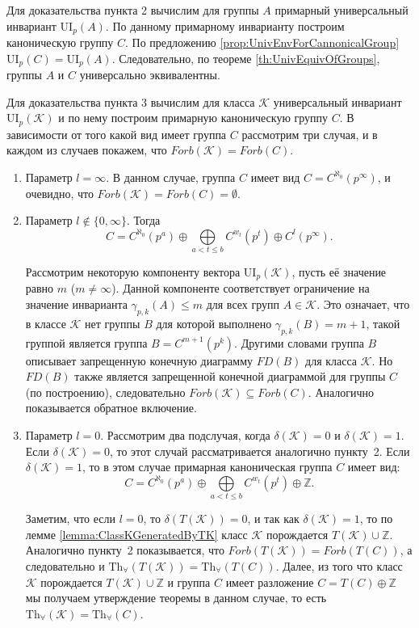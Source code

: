 \documentclass[a4paper,11pt,twoside]{article}
\def\K{{\mathcal{K}}}
\def\Z{{\mathbb{Z}}}
\def\Tha{{\mathrm{Th}_\forall}}
\def\ui{{\mathrm{UI}}}
\begin{document}
Для доказательства пункта 2 вычислим для группы $A$ примарный универсальный инвариант $\ui_p(A)$. По данному примарному инварианту построим каноническую группу $C$. По предложению \ref{prop:UnivEnvForCannonicalGroup} $\ui_p(C) = \ui_p(A)$. Следовательно, по теореме \ref{th:UnivEquivOfGroups}, группы $A$ и $C$ универсально эквивалентны.

Для доказательства пункта 3 вычислим для класса $\K$ универсальный инвариант $\ui_p(\K)$ и по нему построим примарную каноническую группу $C$. В зависимости от того какой вид имеет группа $C$ рассмотрим три случая, и в каждом из случаев покажем, что $Forb(\K) = Forb(C)$.
\begin{enumerate}
\item Параметр $l = \infty$. В данном случае, группа $C$ имеет вид $C = C^{\aleph_0} (p^\infty)$, и очевидно, что $Forb(\K) = Forb(C) = \emptyset$.
\item Параметр $l \notin \{0, \infty\}$. Тогда 
$$ C = C^{\aleph_0}(p^a) \oplus \bigoplus\limits_{ a < t \leq b} C^{w_t}(p^t) \oplus C^l(p^\infty).$$

Рассмотрим некоторую компоненту вектора $\ui_p(\K)$, пусть её значение равно $m$ ($m \neq \infty$). Данной компоненте соответствует ограничение на значение инварианта $\gamma_{p,k}(A) \leq m$ для всех групп $A \in \K$. Это означает, что в классе $\K$ нет группы $B$ для которой выполнено $\gamma_{p,k}(B) = m+1$, такой группой является группа $B = C^{m+1}(p^k)$. Другими словами группа $B$ описывает запрещенную конечную диаграмму $FD(B)$ для класса $\K$. Но $FD(B)$ также является запрещенной конечной диаграммой для группы $C$ (по построению), следовательно $Forb(\K) \subseteq Forb(C).$ Аналогично показывается обратное включение.

\item Параметр $l = 0$. Рассмотрим два подслучая, когда $\delta(\K) = 0$ и ${\delta(\K) = 1}$. Если $\delta(\K) = 0$, то этот случай рассматривается аналогично пункту~2. Если $\delta(\K) = 1$, то в этом случае примарная каноническая группа $C$ имеет вид:
$$ C = C^{\aleph_0}(p^a) \oplus \bigoplus\limits_{ a < t \leq b} C^{w_t}(p^t) \oplus \Z.$$

Заметим, что если $l = 0$, то $\delta(T(\K)) = 0$, и так как $\delta(\K) = 1$, то по лемме \ref{lemma:ClassKGeneratedByTK} класс $\K$ порождается $T(\K) \cup \Z$. Аналогично пункту~2 показывается, что $Forb(T(\K)) = Forb(T(C))$, а следовательно и $\Tha(T(\K)) = \Tha(T(C))$. Далее, из того что класс $\K$ порождается $T(\K) \cup \Z$ и группа $C$ имеет разложение $C = T(C) \oplus \Z$ мы получаем утверждение теоремы в данном случае, то есть $\Tha(\K) = \Tha(C)$.
\end{enumerate}
\end{document}
